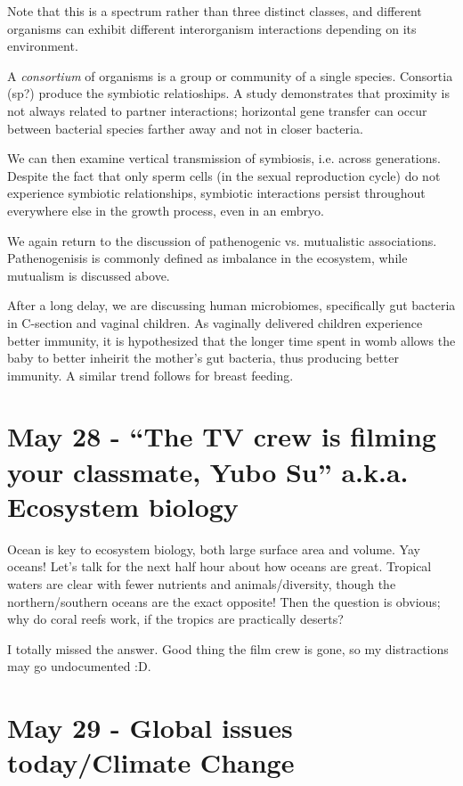 \documentclass[12pt]{article}
\begin{document}
Note that this is a spectrum rather than three distinct classes, and different organisms can exhibit different interorganism interactions depending on its environment. 

A \emph{consortium} of organisms is a group or community of a single species. Consortia (sp?) produce the symbiotic relatioships. A study demonstrates that proximity is not always related to partner interactions; horizontal gene transfer can occur between bacterial species farther away and not in closer bacteria. 

We can then examine vertical transmission of symbiosis, i.e. across generations. Despite the fact that only sperm cells (in the sexual reproduction cycle) do not experience symbiotic relationships, symbiotic interactions persist throughout everywhere else in the growth process, even in an embryo.

We again return to the discussion of pathenogenic vs. mutualistic associations. Pathenogenisis is commonly defined as imbalance in the ecosystem, while mutualism is discussed above.

After a long delay, we are discussing human microbiomes, specifically gut bacteria in C-section and vaginal children. As vaginally delivered children experience better immunity, it is hypothesized that the longer time spent in womb allows the baby to better inheirit the mother's gut bacteria, thus producing better immunity. A similar trend follows for breast feeding.

\section*{May 28 - ``The TV crew is filming your classmate, Yubo Su'' a.k.a. Ecosystem biology}

Ocean is key to ecosystem biology, both large surface area and volume. Yay oceans! Let's talk for the next half hour about how oceans are great. Tropical waters are clear with fewer nutrients and animals/diversity, though the northern/southern oceans are the exact opposite! Then the question is obvious; why do coral reefs work, if the tropics are practically deserts?

I totally missed the answer. Good thing the film crew is gone, so my distractions may go undocumented :D. 

\section*{May 29 - Global issues today/Climate Change}
\end{document}
